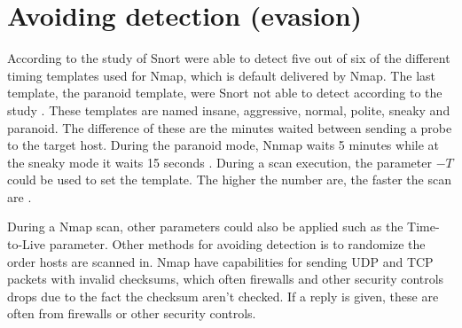 \section{Avoiding detection (evasion)}
\label{s:AvoidingDetection}
According to the study of \textcite{jammes2013snort} Snort were able to detect five out of six of the different timing templates used for Nmap, which is default delivered by Nmap. The last template, the paranoid template, were Snort not able to detect according to the study \autocite{jammes2013snort}.
These templates are named insane, aggressive, normal, polite, sneaky and paranoid. The difference of these are the minutes waited between sending a probe to the target host. During the paranoid mode, Nnmap waits 5 minutes while at the sneaky mode it waits 15 seconds \autocite{pinkard2008nmap, jammes2013snort}.
During a scan execution, the parameter $-T$ could be used to set the template. The higher the number are, the faster the scan are \autocite{pinkard2008nmap}.

During a Nmap scan, other parameters could also be applied such as the Time-to-Live parameter. Other methods for avoiding detection is to randomize the order hosts are scanned in. Nmap have capabilities for sending UDP and TCP packets with invalid checksums, which often firewalls and other security controls drops due to the fact the checksum aren't checked. If a reply is given, these are often from firewalls or other security controls.